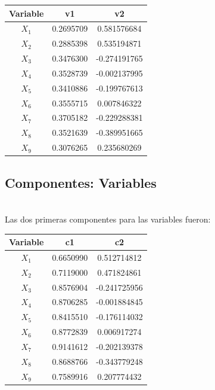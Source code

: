 \documentclass[report,oneside]{revcoles}
\begin{document}
\begin{center}
\begin{tabular}{|c|c|c|}
\hline 
Variable & v1 & v2 \\ 
\hline 
$X_1$ & 0.2695709 & 0.581576684 \\ 
$X_2$ & 0.2885398 & 0.535194871 \\  
$X_3$ & 0.3476300 & -0.274191765 \\  
$X_4$ & 0.3528739 & -0.002137995 \\  
$X_5$ & 0.3410886 & -0.199767613 \\  
$X_6$ & 0.3555715 & 0.007846322 \\ 
$X_7$ & 0.3705182 & -0.229288381 \\  
$X_8$ & 0.3521639 & -0.389951665 \\  
$X_9$ & 0.3076265 & 0.235680269 \\ 
\hline 
\end{tabular} 
\end{center}

\subsection{Componentes: Variables}
~\\Las dos primeras componentes para las variables fueron:

\begin{center}
\begin{tabular}{|c|c|c|}
\hline 
Variable & c1 & c2 \\ 
\hline 
$X_1$ & 0.6650990  & 0.512714812 \\ 
$X_2$ & 0.7119000 &  0.471824861\\  
$X_3$ & 0.8576904 & -0.241725956 \\  
$X_4$ & 0.8706285 &  -0.001884845\\  
$X_5$ & 0.8415510 &  -0.176114032\\  
$X_6$ & 0.8772839 &  0.006917274\\ 
$X_7$ & 0.9141612 & -0.202139378 \\  
$X_8$ & 0.8688766 & -0.343779248  \\  
$X_9$ & 0.7589916 & 0.207774432 \\ 
\hline 
\end{tabular} 
\end{center}
\end{document}
